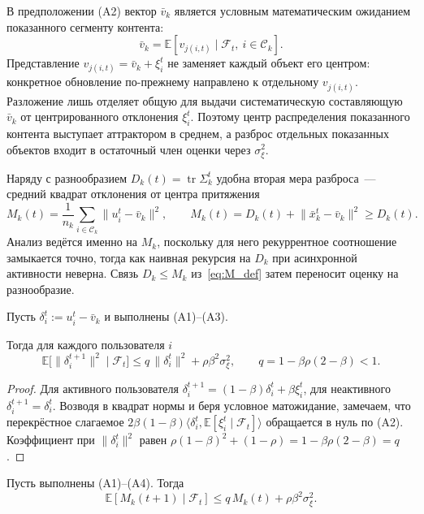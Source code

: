 В предположении \textup{(A2)} вектор $\bar v_k$ является условным
математическим ожиданием показанного сегменту контента:
\[
    \bar v_k
    =\mathbb E[v_{j(i,t)}\mid\mathcal F_t,\ i\in\mathcal C_k].
\]
Представление $v_{j(i,t)}=\bar v_k+\xi_i^t$ не заменяет каждый объект его
центром: конкретное обновление по-прежнему направлено к отдельному
$v_{j(i,t)}$. Разложение лишь отделяет общую для выдачи систематическую
составляющую $\bar v_k$ от центрированного отклонения $\xi_i^t$. Поэтому центр
распределения показанного контента выступает аттрактором в среднем, а разброс
отдельных показанных объектов входит в остаточный член оценки через
$\sigma_\xi^2$.

Наряду с разнообразием $D_k(t)=\operatorname{tr}\Sigma_k^t$ удобна вторая мера
разброса~--- средний квадрат отклонения от центра притяжения
\begin{equation}
    M_k(t)=\frac1{n_k}\sum_{i\in\mathcal C_k}\lVert u_i^t-\bar v_k\rVert^2,
    \qquad M_k(t)=D_k(t)+\lVert\bar x_k^t-\bar v_k\rVert^2\ge D_k(t).
    \label{eq:M_def}
\end{equation}
Анализ ведётся именно на $M_k$, поскольку для него рекуррентное соотношение
замыкается точно, тогда как наивная рекурсия на $D_k$ при асинхронной активности
неверна. Связь $D_k\le M_k$ из~\eqref{eq:M_def} затем переносит оценку на
разнообразие.

\begin{lemma}
\label{lem:individual}
Пусть $\delta_i^t:=u_i^t-\bar v_k$ и выполнены \textup{(A1)--(A3)}.

Тогда для каждого пользователя $i$
\[
    \mathbb E\bigl[\lVert\delta_i^{t+1}\rVert^2\mid\mathcal F_t\bigr]
    \le q\,\lVert\delta_i^t\rVert^2 + \rho\beta^2\sigma_\xi^2,
    \qquad q=1-\beta\rho(2-\beta)<1.
\]
\end{lemma}

\begin{proof}
Для активного пользователя
$\delta_i^{t+1}=(1-\beta)\delta_i^t+\beta\xi_i^t$, для неактивного
$\delta_i^{t+1}=\delta_i^t$. Возводя в квадрат нормы и беря условное
матожидание, замечаем, что перекрёстное слагаемое
$2\beta(1-\beta)\langle\delta_i^t,\mathbb E[\xi_i^t\mid\mathcal F_t]\rangle$
обращается в нуль по (A2). Коэффициент при $\lVert\delta_i^t\rVert^2$ равен
$\rho(1-\beta)^2+(1-\rho)=1-\beta\rho(2-\beta)=q$.
\end{proof}

\begin{lemma}[Рекурсия на $M_k$]
\label{lem:Mk}
Пусть выполнены \textup{(A1)--(A4)}. Тогда
\[
    \mathbb E[M_k(t+1)\mid\mathcal F_t]
    \le q\,M_k(t)+\rho\beta^2\sigma_\xi^2.
\]
\end{lemma}

